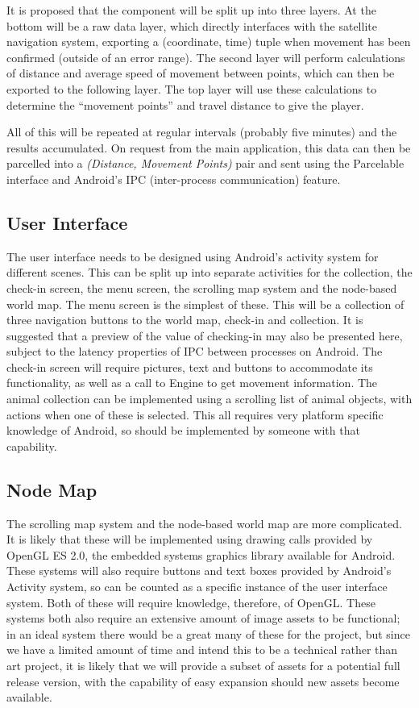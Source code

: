 \documentclass[12pt,a4paper,twoside]{article}
\begin{document}
It is proposed that the component will be split up into three layers.
At the bottom will be a raw data layer, which directly interfaces with the satellite navigation system, exporting a (coordinate, time) tuple when movement has been confirmed (outside of an error range).
The second layer will perform calculations of distance and average speed of movement between points, which can then be exported to the following layer.
The top layer will use these calculations to determine the ``movement points'' and travel distance to give the player.


All of this will be repeated at regular intervals (probably five minutes) and the results accumulated.
On request from the main application, this data can then be parcelled into a \textit{(Distance, Movement Points)} pair and sent using the Parcelable interface and Android's IPC (inter-process communication) feature.

\subsection{User Interface}
The user interface needs to be designed using Android's activity system for different scenes.
This can be split up into separate activities for the collection, the check-in screen, the menu screen, the scrolling map system and the node-based world map.
The menu screen is the simplest of these.
This will be a collection of three navigation buttons to the world map, check-in and collection.
It is suggested that a preview of the value of checking-in may also be presented here, subject to the latency properties of IPC between processes on Android.
The check-in screen will require pictures, text and buttons to accommodate its functionality, as well as a call to Engine to get movement information.
The animal collection can be implemented using a scrolling list of animal objects, with actions when one of these is selected.
This all requires very platform specific knowledge of Android, so should be implemented by someone with that capability.

\subsection{Node Map}
The scrolling map system and the node-based world map are more complicated.
It is likely that these will be implemented using drawing calls provided by OpenGL ES 2.0, the embedded systems graphics library available for Android.
These systems will also require buttons and text boxes provided by Android's Activity system, so can be counted as a specific instance of the user interface system.
Both of these will require knowledge, therefore, of OpenGL.
These systems both also require an extensive amount of image assets to be functional; in an ideal system there would be a great many of these for the project, but since we have a limited amount of time and intend this to be a technical rather than art project, it is likely that we will provide a subset of assets for a potential full release version, with the capability of easy expansion should new assets become available.
\end{document}
